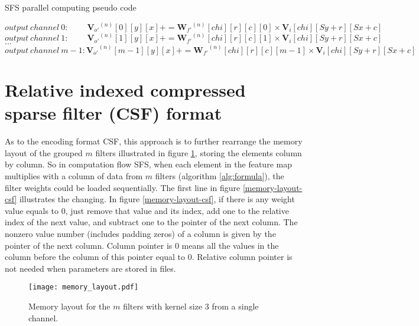 \documentclass{article} %
\begin{document}
\begin{algorithm}\scriptsize
\caption{SFS parallel computing pseudo code}
\label{alg:formula}
\begin{algorithmic}
\STATE $output\ channel\ 0: \ \ \ \ \ \ \ \ \ \ {{\bm{V}_{o'}}^{(n)}}[0][y][x]+={{\bm{W}_{f'}}^{(n)}}[chi][r][c][0]\times {{\bm{V}_{i}}}[chi][Sy+r][Sx+c] $
\STATE $output\ channel\ 1: \ \ \ \ \ \ \ \ \ \ {{\bm{V}_{o'}}^{(n)}}[1][y][x]+={{\bm{W}_{f'}}^{(n)}}[chi][r][c][1]\times {{\bm{V}_{i}}}[chi][Sy+r][Sx+c] $
\STATE $...$
\STATE $output\ channel\ m-1: {{\bm{V}_{o'}}^{(n)}}[m-1][y][x]+={{\bm{W}_{f'}}^{(n)}}[chi][r][c][m-1]\times {{\bm{V}_{i}}}[chi][Sy+r][Sx+c] $
\ENDFOR
\ENDFOR
\ENDFOR
\end{algorithmic}
\end{algorithm}

\section{Relative indexed compressed sparse filter (CSF) format}

As to the encoding format CSF, this approach is to further rearrange the memory layout of the grouped $m$ filters illustrated in figure \ref{memory-layout}, storing the elements column by column. So in computation flow SFS, when each element in the feature map multiplies with a column of data from $m$ filters (algorithm \ref{alg:formula}), the filter weights could be loaded sequentially. The first line in figure \ref{memory-layout-csf} illustrates the changing. In figure \ref{memory-layout-csf}, if there is any weight value equals to 0, just remove that value and its index, add one to the relative index of the next value, and subtract one to the pointer of the next column. The nonzero value number (includes padding zeros) of a column is given by the pointer of the next column. Column pointer is 0 means all the values in the column before the column of this pointer equal to 0. Relative column pointer is not needed when parameters are stored in files.

\begin{figure}[h]
\begin{center}
\texttt{[image: memory\_layout.pdf]}
\end{center}
\caption{Memory layout for the $m$ filters with kernel size 3 from a single channel.}
\label{memory-layout}
\end{figure}
\end{document}
